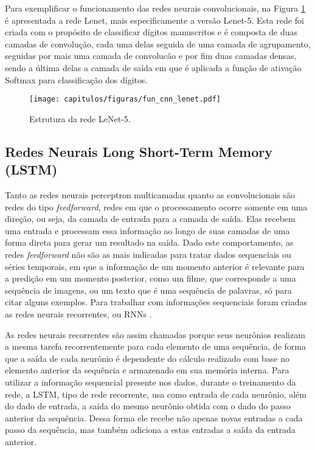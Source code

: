 Para exemplificar o funcionamento das redes neurais convolucionais, na Figura \ref{fig:fun_cnn_lenet} é apresentada a rede Lenet, mais especificamente a versão Lenet-5. Esta rede foi criada com o propósito de classificar dígitos manuscritos e é composta de duas camadas de convolução, cada uma delas seguida de uma camada de agrupamento, seguidas por mais uma camada de convolucão e por fim duas camadas densas, sendo a última delas a camada de saída em que é aplicada a função de ativação Softmax para classificação dos dígitos. 

\begin{figure}[!ht]
\centering
\texttt{[image: capitulos/figuras/fun\_cnn\_lenet.pdf]}
\caption{Estrutura da rede LeNet-5.}
\label{fig:fun_cnn_lenet}
\end{figure}

\subsection{Redes Neurais Long Short-Term Memory (LSTM)}\label{subsec:cap_fundamentos_lstm}

Tanto as redes neurais perceptron multicamadas quanto as convolucionais são redes do tipo \textit{feedforward}, redes em que o processamento ocorre somente em uma direção, ou seja, da camada de entrada para a camada de saída. Elas recebem uma entrada e processam essa informação ao longo de suas camadas de uma forma direta para gerar um resultado na saída. Dado este comportamento, as redes \textit{feedforward} não são as mais indicadas para tratar dados sequenciais ou séries temporais, em que a informação de um momento anterior é relevante para a predição em um momento posterior, como um filme, que corresponde a uma sequência de imagens, ou um texto que é uma sequência de palavras, só para citar alguns exemplos. Para trabalhar com informações sequenciais foram criadas as redes neurais recorrentes, ou RNNs \cite{Rumelhart1986}.

As redes neurais recorrentes são assim chamadas porque seus neurônios realizam a mesma tarefa recorrentemente para cada elemento de uma sequência, de forma que a saída de cada neurônio é dependente do cálculo realizado com base no elemento anterior da sequência e armazenado em sua memória interna. Para utilizar a informação sequencial presente nos dados, durante o treinamento da rede, a LSTM, tipo de rede recorrente, usa como entrada de cada neurônio, além do dado de entrada, a saída do mesmo neurônio obtida com o dado do passo anterior da sequência. Dessa forma ele recebe não apenas novas entradas a cada passo da sequência, mas também adiciona a estas entradas a saída da entrada anterior.

